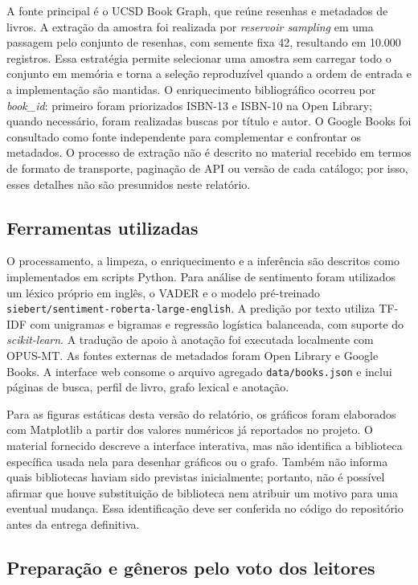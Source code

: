 \documentclass[conference]{IEEEtran}
\begin{document}
A fonte principal é o UCSD Book Graph, que reúne resenhas e metadados de livros.
A extração da amostra foi realizada por \textit{reservoir sampling} em uma
passagem pelo conjunto de resenhas, com semente fixa 42, resultando em 10.000
registros. Essa estratégia permite selecionar uma amostra sem carregar todo o
conjunto em memória e torna a seleção reproduzível quando a ordem de entrada e
a implementação são mantidas. O enriquecimento bibliográfico ocorreu por
\textit{book\_id}: primeiro foram priorizados ISBN-13 e ISBN-10 na Open Library;
quando necessário, foram realizadas buscas por título e autor. O Google Books
foi consultado como fonte independente para complementar e confrontar os
metadados. O processo de extração não é descrito no material recebido em termos
de formato de transporte, paginação de API ou versão de cada catálogo; por
isso, esses detalhes não são presumidos neste relatório.

\subsection{Ferramentas utilizadas}

O processamento, a limpeza, o enriquecimento e a inferência são descritos como
implementados em scripts Python. Para análise de sentimento foram utilizados
um léxico próprio em inglês, o VADER e o modelo pré-treinado
\texttt{siebert/sentiment-roberta-large-english}. A predição por texto utiliza
TF-IDF com unigramas e bigramas e regressão logística balanceada, com suporte
do \textit{scikit-learn}. A tradução de apoio à anotação foi executada
localmente com OPUS-MT. As fontes externas de metadados foram Open Library e
Google Books. A interface web consome o arquivo agregado
\texttt{data/books.json} e inclui páginas de busca, perfil de livro, grafo
lexical e anotação.

Para as figuras estáticas desta versão do relatório, os gráficos foram
elaborados com Matplotlib a partir dos valores numéricos já reportados no
projeto. O material fornecido descreve a interface interativa, mas não identifica
a biblioteca específica usada nela para desenhar gráficos ou o grafo. Também
não informa quais bibliotecas haviam sido previstas inicialmente; portanto,
não é possível afirmar que houve substituição de biblioteca nem atribuir um
motivo para uma eventual mudança. Essa identificação deve ser conferida no
código do repositório antes da entrega definitiva.

\subsection{Preparação e gêneros pelo voto dos leitores}
\end{document}
